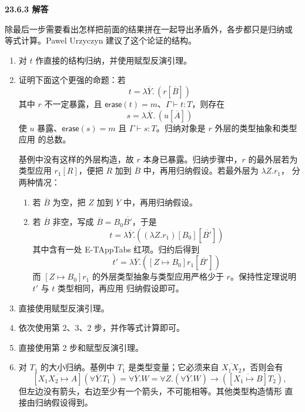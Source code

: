 \begin{taplauthorsolutionentrybox}
\label{sol:author:23.6.3}
\textbf{23.6.3 解答}

除最后一步需要看出怎样把前面的结果拼在一起导出矛盾外，各步都只是归纳或
等式计算。Pawel Urzyczyn 建议了这个论证的结构。
\begin{enumerate}
  \item 对 \(t\) 作直接的结构归纳，并使用赋型反演引理。

  \item 证明下面这个更强的命题：若
        \[
        t=\lambda\overline Y.\,(r[\overline B])
        \]
        其中 \(r\) 不一定暴露，且
        \(\mathsf{erase}(t)=m\)、\(\Gamma\vdash t:T\)，则存在
        \[
        s=\lambda\overline X.\,(u[\overline A])
        \]
        使 \(u\) 暴露、\(\mathsf{erase}(s)=m\) 且
        \(\Gamma\vdash s:T\)。归纳对象是 \(r\) 外层的类型抽象和类型应用
        的总数。

        基例中没有这样的外层构造，故 \(r\) 本身已暴露。归纳步骤中，\(r\)
        的最外层若为类型应用 \(r_1[R]\)，便把 \(R\) 加到
        \(\overline B\) 中，再用归纳假设。若最外层为 \(\lambda Z.r_1\)，
        分两种情况：
        \begin{enumerate}
          \item 若 \(\overline B\) 为空，把 \(Z\) 加到
                \(\overline Y\) 中，再用归纳假设。
          \item 若 \(\overline B\) 非空，写成
                \(\overline B=B_0\overline{B'}\)，于是
                \[
                t=\lambda\overline Y.
                  ((\lambda Z.r_1)[B_0][\overline{B'}])
                \]
                其中含有一处 E-TAppTabs 红项。归约后得到
                \[
                t'=\lambda\overline Y.
                   ([Z\mapsto B_0]r_1[\overline{B'}])
                \]
                而 \([Z\mapsto B_0]r_1\) 的外层类型抽象与类型应用严格少于
                \(r\)。保持性定理说明 \(t'\) 与 \(t\) 类型相同，再应用
                归纳假设即可。
        \end{enumerate}

  \item 直接使用赋型反演引理。

  \item 依次使用第 2、3、2 步，并作等式计算即可。

  \item 直接使用第 2 步和赋型反演引理。

  \item 对 \(T_1\) 的大小归纳。基例中 \(T_1\) 是类型变量；它必须来自
        \(\overline{X_1X_2}\)，否则会有
        \[
        [\overline{X_1X_2\mapsto A}](\forall\overline Y.T_1)
        =\forall\overline Y.W
        =\forall Z.(\forall\overline Y.W)\to
          ([\overline{X_1\mapsto B}]T_2),
        \]
        但左边没有箭头，右边至少有一个箭头，不可能相等。其他类型构造情形
        直接由归纳假设得到。


\end{enumerate}
\end{taplauthorsolutionentrybox}
